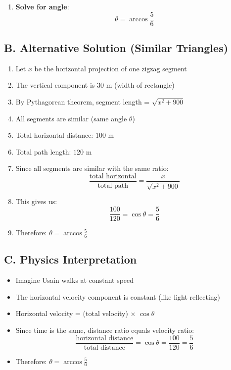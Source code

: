 \documentclass[11pt]{article}
\begin{document}
\begin{solutionbox}
\begin{enumerate}[leftmargin=*]
    \item \textbf{Solve for angle}:
    \[\theta = \arccos\frac{5}{6}\]
\end{enumerate}

\subsection*{B. Alternative Solution (Similar Triangles)}
\begin{enumerate}[leftmargin=*]
    \item Let $x$ be the horizontal projection of one zigzag segment
    \item The vertical component is $30$ m (width of rectangle)
    \item By Pythagorean theorem, segment length = $\sqrt{x^2 + 900}$
    \item All segments are similar (same angle $\theta$)
    \item Total horizontal distance: $100$ m
    \item Total path length: $120$ m
    \item Since all segments are similar with the same ratio:
    \[\frac{\text{total horizontal}}{\text{total path}} = \frac{x}{\sqrt{x^2 + 900}}\]
    \item This gives us:
    \[\frac{100}{120} = \cos\theta = \frac{5}{6}\]
    \item Therefore: $\theta = \arccos\frac{5}{6}$
\end{enumerate}

\subsection*{C. Physics Interpretation}
\begin{itemize}[leftmargin=*]
    \item Imagine Usain walks at constant speed
    \item The horizontal velocity component is constant (like light reflecting)
    \item Horizontal velocity = (total velocity) $\times$ $\cos\theta$
    \item Since time is the same, distance ratio equals velocity ratio:
    \[\frac{\text{horizontal distance}}{\text{total distance}} = \cos\theta = \frac{100}{120} = \frac{5}{6}\]
    \item Therefore: $\theta = \arccos\frac{5}{6}$
\end{itemize}


\end{solutionbox}
\end{document}
